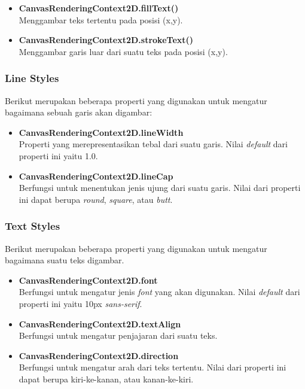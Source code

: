 \begin{itemize}
	\item \textbf{CanvasRenderingContext2D.fillText()} \\ Menggambar teks tertentu pada posisi (x,y).
	\item \textbf{CanvasRenderingContext2D.strokeText()} \\ Menggambar garis luar dari suatu teks pada posisi (x,y).
\end{itemize}

\subsubsection{Line Styles}
Berikut merupakan beberapa properti yang digunakan untuk mengatur bagaimana sebuah garis akan digambar:

\begin{itemize}
	\item \textbf{CanvasRenderingContext2D.lineWidth} \\ Properti yang merepresentasikan tebal dari suatu garis. Nilai \textit{default} dari properti ini yaitu 1.0.
	\item \textbf{CanvasRenderingContext2D.lineCap} \\ Berfungsi untuk menentukan jenis ujung dari suatu garis. Nilai dari properti ini dapat berupa \textit{round}, \textit{square}, atau \textit{butt}. 
\end{itemize}

\subsubsection{Text Styles}
Berikut merupakan beberapa properti yang digunakan untuk mengatur bagaimana suatu teks digambar.

\begin{itemize}
	\item \textbf{CanvasRenderingContext2D.font} \\ Berfungsi untuk mengatur jenis \textit{font} yang akan digunakan. Nilai \textit{default} dari properti ini yaitu 10px \textit{sans-serif}.
	\item \textbf{CanvasRenderingContext2D.textAlign} \\ Berfungsi untuk mengatur penjajaran dari suatu teks.
	\item \textbf{CanvasRenderingContext2D.direction} \\  Berfungsi untuk mengatur arah dari teks tertentu. Nilai dari properti ini dapat berupa kiri-ke-kanan, atau kanan-ke-kiri.
\end{itemize}

